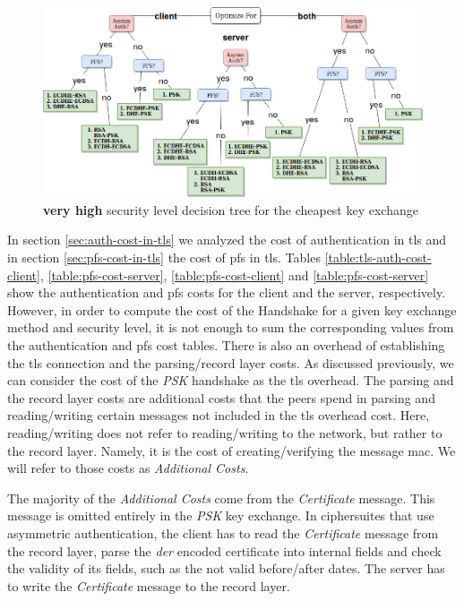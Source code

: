 \begin{figure}
  \centering
  \includegraphics[width=1.0\textwidth]{img/dt_veryhigh_sl.png}
  \centering \caption{\label{fig:dt-veryhigh-sl} \textbf{very high} security level decision tree for the cheapest key exchange}
\end{figure}

In section \ref{sec:auth-cost-in-tls} we analyzed the cost of authentication in \gls{tls} and in section \ref{sec:pfs-cost-in-tls}
the cost of \gls{pfs} in \gls{tls}. Tables \ref{table:tls-auth-cost-client}, \ref{table:pfs-cost-server},
\ref{table:pfs-cost-client} and \ref{table:pfs-cost-server} show the authentication and \gls{pfs} costs for the client and the server,
respectively. However, in order to compute the cost of the Handshake for a given key exchange method and security level, it
is not enough to sum the corresponding values from the authentication and \gls{pfs} cost tables. There is also an overhead of 
establishing the \gls{tls} connection and the parsing/record layer costs. As discussed previously, we can consider the cost of 
the \textit{PSK} handshake as the \gls{tls} overhead.
The parsing and the record layer costs are additional costs that the
peers spend in parsing and reading/writing certain messages not included in the \gls{tls} overhead cost.
Here, reading/writing does not refer to reading/writing to the network, but rather to the record layer. Namely, it is the cost of creating/verifying
the message \gls{mac}. We will refer to those costs as \textit{Additional Costs}.

The majority of the \textit{Additional Costs} come from the \textit{Certificate} message.
This message is omitted entirely in the \textit{PSK} key exchange. In ciphersuites that use asymmetric authentication,
the client has to read the  \textit{Certificate} message from the record layer, parse the \textit{der} encoded certificate into internal fields and
check the validity of its fields, such as the not valid before/after dates. The server has to write the \textit{Certificate} message to the
record layer.

